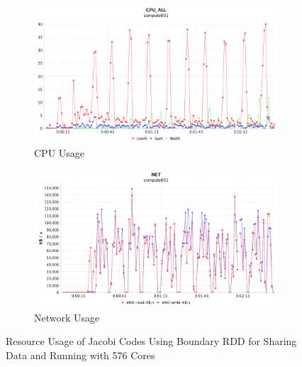 \begin{figure}[!ht]
\centering
\begin{subfigure}{1\textwidth}
  \centering
  \includegraphics[width=1\linewidth]{figures/JacobiBRDD131_576_CPU.png}
  \caption{CPU Usage}
  \label{JacobiBRDD131_576_CPU}
\end{subfigure}
\begin{subfigure}{1\textwidth}
  \centering
  \includegraphics[width=1\linewidth]{figures/JacobiBRDD131_576_NET.png}
  \caption{Network Usage}
  \label{JacobiBRDD131_576_NET}
\end{subfigure}
\caption{Resource Usage of Jacobi Codes Using Boundary RDD for Sharing Data and Running with 576 Cores}
\label{JacobiBRDD131_576}
\end{figure}


